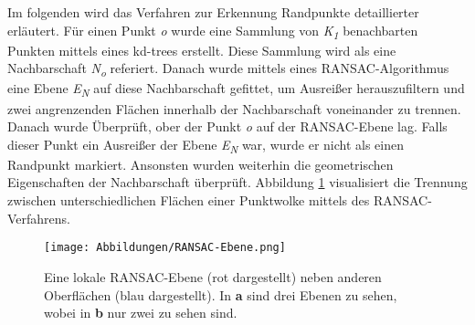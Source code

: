 Im folgenden wird das Verfahren zur Erkennung Randpunkte detaillierter erläutert. Für einen Punkt \textit{o} wurde eine Sammlung von \textit{K\textsubscript{1}} benachbarten Punkten mittels eines kd-trees erstellt. Diese Sammlung wird als eine Nachbarschaft \textit{N\textsubscript{o}} referiert. Danach wurde mittels eines RANSAC-Algorithmus eine Ebene \textit{E\textsubscript{N}} auf diese Nachbarschaft gefittet, um Ausreißer herauszufiltern und zwei angrenzenden Flächen innerhalb der Nachbarschaft voneinander zu trennen. Danach wurde Überprüft, ober der Punkt \textit{o} auf der RANSAC-Ebene lag. Falls dieser Punkt ein Ausreißer der Ebene \textit{E\textsubscript{N}} war, wurde er nicht als einen Randpunkt markiert. Ansonsten wurden weiterhin die geometrischen Eigenschaften der Nachbarschaft überprüft. Abbildung \ref{RANSAC-Ebene} visualisiert die Trennung zwischen unterschiedlichen Flächen einer Punktwolke mittels des RANSAC-Verfahrens. 

\begin{figure}[h]
	\texttt{[image: Abbildungen/RANSAC-Ebene.png]}
	\centering
	\caption{Eine lokale RANSAC-Ebene (rot dargestellt) neben anderen Oberflächen (blau dargestellt). In \textbf{a} sind drei Ebenen zu sehen, wobei in \textbf{b} nur zwei zu sehen sind. \autocite{ni_edge_2016}}
	\label{RANSAC-Ebene}
\end{figure} 

